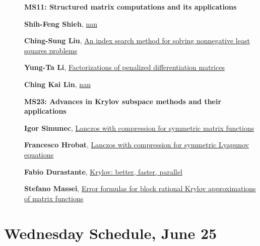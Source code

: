 \documentclass[ILAS2025-program.tex]{subfiles}
\begin{document}
\begin{description}
\begin{description}
        \end{description}
    \begin{description}
    \item[] {\color{mstitle}\textbf{MS11: Structured matrix computations and its applications}} 
    \item[] \hypertarget{up0233}{}\textbf{Shih-Feng Shieh}, \hyperlink{down0233}{nan}
        \item[] \hypertarget{up0234}{}\textbf{Ching-Sung Liu}, \hyperlink{down0234}{An index search method for solving nonnegative least squares problems
}
        \item[] \hypertarget{up0235}{}\textbf{Yung-Ta Li}, \hyperlink{down0235}{Factorizations of penalized differentiation matrices
}
        \item[] \hypertarget{up0236}{}\textbf{Ching Kai Lin}, \hyperlink{down0236}{nan}
        \end{description}
    \begin{description}
    \item[] {\color{mstitle}\textbf{MS23: Advances in Krylov subspace methods and their applications}} 
    \item[] \hypertarget{up0237}{}\textbf{Igor Simunec}, \hyperlink{down0237}{Lanczos with compression for symmetric matrix functions}
        \item[] \hypertarget{up0238}{}\textbf{Francesco Hrobat}, \hyperlink{down0238}{Lanczos with compression for symmetric Lyapunov equations}
        \item[] \hypertarget{up0239}{}\textbf{Fabio Durastante}, \hyperlink{down0239}{Krylov: better, faster, parallel}
        \item[] \hypertarget{up0240}{}\textbf{Stefano Massei}, \hyperlink{down0240}{Error formulas for block rational Krylov approximations of matrix functions}
        \end{description}
    \end{description}
    \newpage

\section{Wednesday Schedule, June 25}
    
\end{document}
